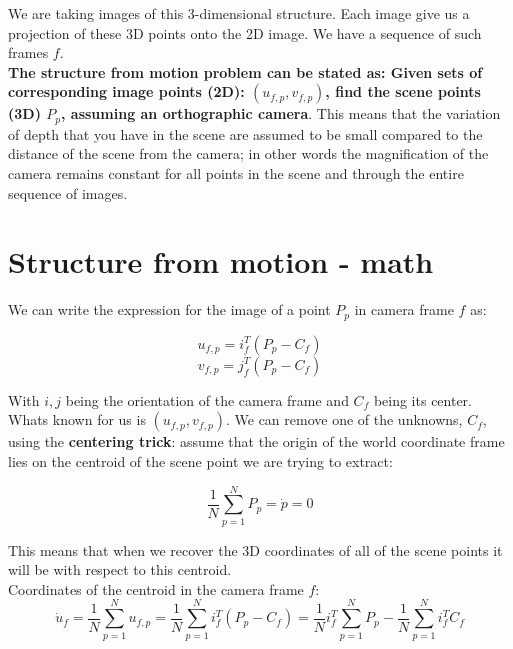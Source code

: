 \documentclass{article}
\begin{document}
We are taking images of this 3-dimensional structure. Each image give us a projection of these 3D points onto the 2D image. We have a sequence of such frames $f$. \\

\textbf{The structure from motion problem can be stated as:
Given sets of corresponding image points (2D): $(u_{f,p}, v_{f,p})$, find the scene points (3D) $P_p$, assuming an orthographic camera}. This means that the variation of depth that you have in the scene are assumed to be small compared to the distance of the scene from the camera; in other words the magnification of the camera remains constant for all points in the scene and through the entire sequence of images. 

\newpage

\section*{Structure from motion - math}

We can write the expression for the image of a point $P_p$ in camera frame $f$ as:

\begin{equation*}
    u_{f,p} = i_f^T(P_p-C_f)
\end{equation*}
\begin{equation*}
    v_{f,p} = j_f^T(P_p-C_f)
\end{equation*}

With $i, j$ being the orientation of the camera frame and $C_f$ being its center. Whats known for us is $(u_{f,p}, v_{f,p})$. We can remove one of the unknowns, $C_f$, using the \textbf{centering trick}: assume that the origin of the world coordinate frame lies on the centroid of the scene point we are trying to extract:

\begin{equation*}
    \frac{1}{N} \sum_{p=1}^N P_p = \dot p = 0
\end{equation*}

This means that when we recover the 3D coordinates of all of the scene points it will be with respect to this centroid. \\ 

Coordinates of the centroid in the camera frame $f$:
\begin{equation*}
    \dot u_f = \frac{1}{N} \sum_{p=1}^N u_{f, p} = \frac{1}{N} \sum_{p=1}^N i_f^T(P_p - C_f) = \frac{1}{N} i_f^T \sum_{p=1}^N P_p - \frac{1}{N} \sum_{p=1}^N i_f^T C_f
\end{equation*}
\end{document}
